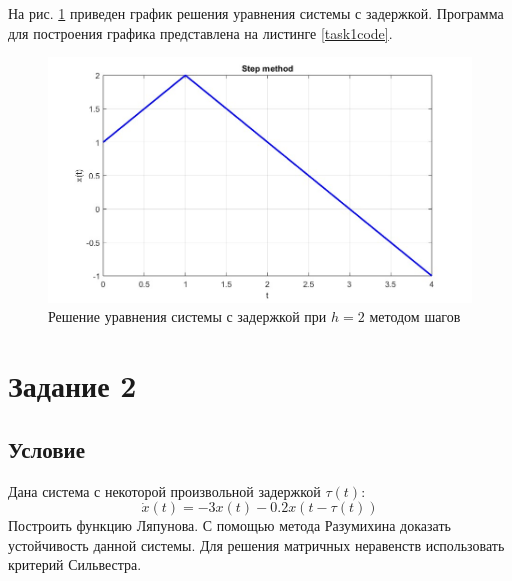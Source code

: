 \documentclass[a4paper, 12pt]{article}
\begin{document}
    На рис. \ref{fig:task1} приведен график решения уравнения системы с задержкой.
    Программа для построения графика представлена на листинге \ref{task1code}.
    \begin{figure}[H]
        \centering
        \includegraphics[scale=0.4]{task1.jpg}
        \captionsetup{skip=0pt}
        \caption{Решение уравнения системы с задержкой при $h=2$ методом шагов}
        \label{fig:task1}
    \end{figure}


    \section{Задание 2}
    \subsection{Условие}
    Дана система с некоторой произвольной задержкой $\tau(t)$:
    $$\dot{x}(t)=-3x(t)-0.2x(t-\tau(t))$$
    Построить функцию Ляпунова. С помощью метода Разумихина
    доказать устойчивость данной системы. 
    Для решения матричных неравенств использовать критерий Сильвестра.
\end{document}
